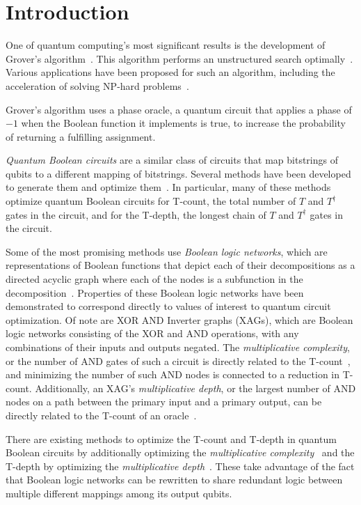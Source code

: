 \section{Introduction}
One of quantum computing's most significant results is the development of Grover's
algorithm~\cite{bib-grover1996fast}. This algorithm performs an unstructured search
optimally~\cite{bib-zaika-grov-opt}. Various applications have
been proposed for such an algorithm, including the acceleration of solving NP-hard
problems~\cite{bib-williams-grover-np}.

Grover's algorithm uses a phase oracle, a quantum circuit that applies a phase of
$-1$ when the Boolean function it implements is true, to increase the probability
of returning a fulfilling assignment.

{\it Quantum Boolean circuits} are a similar class of circuits that map bitstrings of
qubits to a different mapping of bitstrings. Several methods have been developed
to generate them and optimize them~\cite{bib-meuli-mult,bib-amy-rm,bib-meuli-esop}.
In particular, many of these methods optimize quantum Boolean circuits for T-count, the
total number of $T$ and $T^{\dagger}$ gates in the circuit, and for the T-depth,
the longest chain of $T$ and $T^{\dagger}$ gates in the circuit.

Some of the most promising methods use {\it Boolean logic networks}, which are
representations of Boolean functions that depict each of their decompositions as a
directed acyclic graph where each of the nodes is a subfunction in the
decomposition~\cite{bib-meuli-xag,bib-lhrs-soeken}. Properties of these Boolean
logic networks have been demonstrated to correspond directly to values
of interest to quantum circuit optimization. Of note are XOR AND Inverter
graphs (XAGs), which are Boolean logic networks consisting of the XOR and AND
operations, with any combinations of their inputs and outputs negated. The
 {\it multiplicative complexity}, or the number of AND gates of such a circuit
is directly related to the T-count~\cite{bib-meuli-mult}, and minimizing the
number of such AND nodes is connected to a reduction in T-count. Additionally,
an XAG's {\it multiplicative depth}, or the largest number of AND nodes on a
path between the primary input and a primary output, can be directly related
to the T-count of an oracle~\cite{bib-meuli-ros}.

There are existing methods to optimize the T-count and T-depth in quantum Boolean
circuits by additionally optimizing the {\it multiplicative complexity}~\cite{bib-meuli-mult}
and the T-depth by optimizing the {\it multiplicative depth}~\cite{bib-meuli-ros}.
These take advantage of the fact that Boolean logic networks can be rewritten
to share redundant logic between multiple different mappings among its output
qubits.


